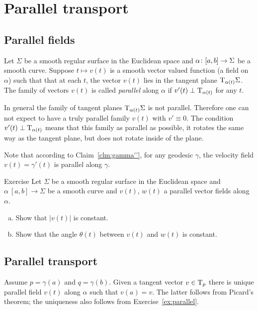 \chapter{Parallel transport}

\section{Parallel fields}

Let $\Sigma$ be a smooth regular surface in the Euclidean space and $\alpha\:[a,b]\z\to \Sigma$ be a smooth curve.
Suppose $t\mapsto v(t)$ is a smooth vector valued function (a field on $\alpha$) such that
that at each $t$, the vector $v(t)$ lies in the tangent plane $\mathrm{T}_{\alpha(t)}\Sigma$.
The family of vectors $v(t)$ is called \emph{parallel} along $\alpha$ if $v'(t)\perp\mathrm{T}_{\alpha(t)}$ for any $t$.

In general the family of tangent planes $\mathrm{T}_{\alpha(t)}\Sigma$ is not parallel.
Therefore one can not expect to have a truly parallel family $v(t)$ with $v'\equiv 0$.
The condition $v'(t)\perp\mathrm{T}_{\alpha(t)}$ means that this family as parallel as possible, it rotates the same way as the tangent plane, but does not rotate inside of the plane.

Note that according to Claim~\ref{clm:gamma''}, for any geodesic $\gamma$, the velocity field $v(t)=\gamma'(t)$ is parallel along $\gamma$.


\begin{thm}{Exercise}\label{ex:parallel}
Let $\Sigma$ be a smooth regular surface in the Euclidean space and $\alpha\:[a,b]\to \Sigma$ be a smooth curve and $v(t)$, $w(t)$ a parallel vector fields along $\alpha$.
\begin{enumerate}[(a)]
 \item Show that $|v(t)|$ is constant.
 \item Show that the angle $\theta(t)$ between $v(t)$ and $w(t)$ is constant.
\end{enumerate}
\end{thm}

\section{Parallel transport}

Assume $p=\gamma(a)$ and $q=\gamma(b)$.
Given a tangent vector $v\in\mathrm{T}_p$ there is unique parallel field $v(t)$ along $\alpha$ such that $v(a)=v$.
The latter follows from Picard's theorem; the uniqueness also follows from Exercise~\ref{ex:parallel}.


